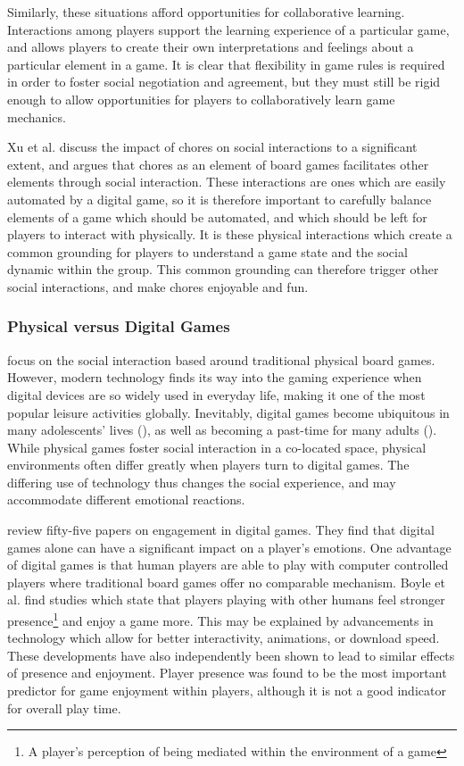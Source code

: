 \documentclass[12pt]{article}
\begin{document}
Similarly, these situations afford opportunities for collaborative learning. Interactions among players support the learning experience of a particular game, and allows players to create their own interpretations and feelings about a particular element in a game. It is clear that flexibility in game rules is required in order to foster social negotiation and agreement, but they must still be rigid enough to allow opportunities for players to collaboratively learn game mechanics. 

Xu et al. discuss the impact of chores on social interactions to a significant extent, and argues that chores as an element of board games facilitates other elements through social interaction. 
These interactions are ones which are easily automated by a digital game, so it is therefore important to carefully balance elements of a game which should be automated, and which should be left for players to interact with physically. 
It is these physical interactions which create a common grounding for players to understand a game state and the social dynamic within the group. 
This common grounding can therefore trigger other social interactions, and make chores enjoyable and fun. 

\subsubsection{Physical versus Digital Games}
\textcite{xu2011chores} focus on the social interaction based around traditional physical board games. 
However, modern technology finds its way into the gaming experience when digital devices are so widely used in everyday life, making it one of the most popular leisure activities globally. 
Inevitably, digital games become ubiquitous in many adolescents' lives (\cite{fang2016emotional}), as well as becoming a past-time for many adults (\cite{boyle2012engagement}). 
While physical games foster social interaction in a co-located space, physical environments often differ greatly when players turn to digital games. 
The differing use of technology thus changes the social experience, and may accommodate different emotional reactions. 

\textcite{boyle2012engagement} review fifty-five papers on engagement in digital games. 
They find that digital games alone can have a significant impact on a player's emotions. 
One advantage of digital games is that human players are able to play with computer controlled players where traditional board games offer no comparable mechanism. 
Boyle et al. find studies which state that players playing with other humans feel stronger presence\footnote{A player's perception of being mediated within the environment of a game} and enjoy a game more.  
This may be explained by advancements in technology which allow for better interactivity, animations, or download speed.
These developments have also independently been shown to lead to similar effects of presence and enjoyment. 
Player presence was found to be the most important predictor for game enjoyment within players, although it is not a good indicator for overall play time.
\end{document}
